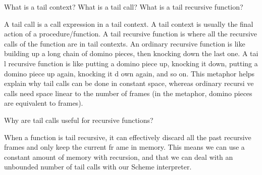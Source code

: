 \begin{blocksection}
\question What is a tail context? What is a tail call? What is a tail recursive function?

\begin{solution}[0.5in]
A tail call is a call expression in a tail context. A tail context is usually the final action of a procedure/function.
\newline
A tail recursive function is where all the recursive calls of the function are in tail contexts. \newline
\newline
An ordinary recursive function is like building up a long chain of domino pieces, then knocking down the last one. A tai
l recursive function is like putting a domino piece up, knocking it down, putting a domino piece up again, knocking it d
own again, and so on. This metaphor helps explain why tail calls can be done in constant space, whereas ordinary recursi
ve calls need space linear to the number of frames (in the metaphor, domino pieces are equivalent to frames).
\end{solution}

\question Why are tail calls useful for recursive functions?

\begin{solution}[0.5in]
When a function is tail recursive, it can effectively discard all the past recursive frames and only keep the current fr
ame in memory. This means we can use a constant amount of memory with recursion, and that we can deal with an unbounded
number of tail calls with our Scheme interpreter.
\end{solution}

\end{blocksection}
